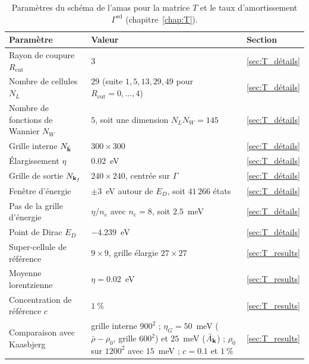 \vspace*{\fill}
\begin{table}[htbp]
    \centering
    \caption[Paramètres de la matrice $T$ et du taux d'amortissement $\Gamma^\text{ed}$.]{Paramètres du schéma de l'amas pour la matrice $T$ et le taux d'amortissement $\Gamma^\text{ed}$ (chapitre~\ref{chap:T}).}
    \label{tab:param_T}
    \small
    \setlength{\tabcolsep}{4pt}
    \begin{tabular}{p{} p{} p{}}
        \hline\hline
        Paramètre & Valeur & Section \\
        \hline
        Rayon de coupure $R_\text{cut}$ & $3$ & \ref{sec:T_détails} \\
        Nombre de cellules $N_L$ & $29$ (suite $1, 5, 13, 29, 49$ pour $R_\text{cut} = 0, \dots, 4$) & \ref{sec:T_détails} \\
        Nombre de fonctions de Wannier $N_W$ & $5$, soit une dimension $N_LN_W = 145$ & \ref{sec:T_détails} \\
        Grille interne $N_{\tilde{\mathbf{k}}}$ & $300\times 300$ & \ref{sec:T_détails} \\
        Élargissement $\eta$ & $0.02$~eV & \ref{sec:T_détails} \\
        Grille de sortie $N_{\mathbf{k}_f}$ & $240\times 240$, centrée sur $\Gamma$ & \ref{sec:T_détails} \\
        Fenêtre d'énergie & $\pm 3$~eV autour de $E_D$, soit $41\,266$ états & \ref{sec:T_détails} \\
        Pas de la grille d'énergie & $\eta/n_e$ avec $n_e = 8$, soit $2.5$~meV & \ref{sec:T_détails} \\
        Point de Dirac $E_D$ & $-4.239$~eV & \ref{sec:T_détails} \\
        Super-cellule de référence & $9\times 9$, grille élargie $27\times 27$ & \ref{sec:T_results} \\
        Moyenne lorentzienne & $\eta = 0.02$~eV & \ref{sec:T_results} \\
        Concentration de référence $c$ & $1~\%$ & \ref{sec:T_results} \\
        Comparaison avec Kaasbjerg & grille interne $900^2$ ; $\eta_G = 50$~meV ($\bar\rho - \rho_0$, grille $600^2$) et $25$~meV ($\bar A_{\mathbf{k}}$) ; $\rho_0$ sur $1200^2$ avec $15$~meV ; $c = 0.1$ et $1~\%$ & \ref{sec:T_results} \\
        \hline\hline
    \end{tabular}
\end{table}
\vspace*{\fill}
